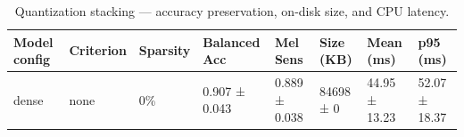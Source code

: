 \begin{table}[t]
\centering
\small
\begin{tabular}{llllllll}
\toprule
Model config & Criterion & Sparsity & Balanced Acc & Mel Sens & Size (KB) & Mean (ms) & p95 (ms) \\
\midrule
dense & none & 0\% & 0.907 ± 0.043 & 0.889 ± 0.038 & 84698 ± 0 & 44.95 ± 13.23 & 52.07 ± 18.37 \\
\bottomrule
\end{tabular}
\caption{Quantization stacking — accuracy preservation, on-disk size, and CPU latency.}
\label{tab:quantization}
\end{table}